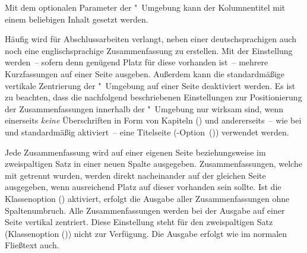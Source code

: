 \begin{DeclareEntity*}{}
\begin{DeclareEntity*}{}
\begin{DeclareEntity*}{}
\begin{Declaration}
Mit dem optionalen Parameter  der 
"~Umgebung kann der Kolumnentitel mit einem beliebigen 
Inhalt gesetzt werden.

Häufig wird für Abschlussarbeiten verlangt, neben einer deutschsprachigen auch 
noch eine englischsprachige Zusammenfassung zu erstellen. Mit der Einstellung 
 werden~-- sofern denn genügend Platz für diese 
vorhanden ist~-- mehrere Kurzfassungen auf einer Seite ausgeben. Außerdem kann 
die standardmäßige vertikale Zentrierung der "~Umgebung 
auf einer Seite deaktiviert werden. Es ist zu beachten, dass die nachfolgend 
beschriebenen Einstellungen zur Positionierung der Zusammenfassungen innerhalb 
der "~Umgebung nur wirksam sind, wenn einerseits 
\emph{keine} Überschriften in Form von Kapiteln ()
und andererseits~-- wie bei  und  
standardmäßig aktiviert~-- eine Titelseite 
(\KOMAScript-Option~()) verwendet 
werden.
\begin{DeclareValues}
  Jede Zusammenfassung wird auf einer eigenen Seite
  beziehungsweise im zweispaltigen Satz in einer neuen Spalte ausgegeben.
  Zusammenfassungen, welche mit  getrennt wurden, werden 
  direkt nacheinander auf der gleichen Seite ausgegeben, wenn ausreichend Platz 
  auf dieser vorhanden sein sollte. Ist die Klassenoption 
  () aktiviert, erfolgt die Ausgabe aller 
  Zusammenfassungen ohne Spaltenumbruch.
  Alle Zusammenfassungen werden bei der Ausgabe auf einer Seite vertikal 
  zentriert. Diese Einstellung steht für den zweispaltigen Satz
  (Klassenoption ()) nicht zur Verfügung.
  Die Ausgabe erfolgt wie im normalen Fließtext auch.
\end{DeclareValues}
\end{Declaration}


\end{DeclareEntity*}
\end{DeclareEntity*}
\end{DeclareEntity*}
